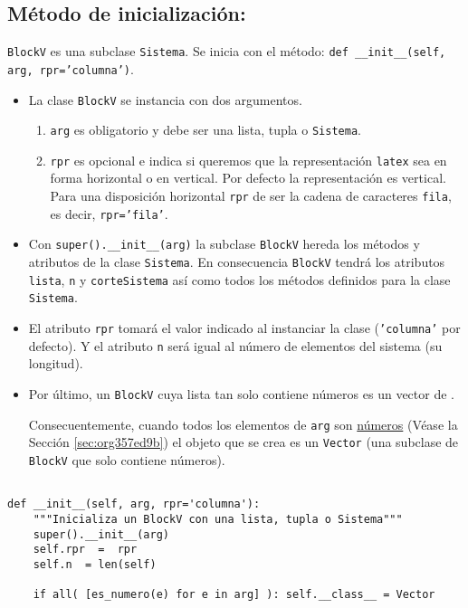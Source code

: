 \documentclass[11pt]{report}
\begin{document}
\subsection{Método de inicialización:}
\label{sec:orgc6c0e44}

\texttt{BlockV} es una subclase \texttt{Sistema}. Se inicia con el método: \texttt{def
\_\_init\_\_(self, arg, rpr='columna')}.

\begin{itemize}
\item La clase \texttt{BlockV} se instancia con dos argumentos. 

\begin{enumerate}
\item \texttt{arg} es obligatorio y debe ser una lista, tupla o \texttt{Sistema}.

\item \texttt{rpr} es opcional e indica si queremos que la representación
\texttt{latex} sea en forma horizontal o en vertical. Por defecto la
representación es vertical. Para una disposición horizontal \texttt{rpr}
de ser la cadena de caracteres \texttt{fila}, es decir, \texttt{rpr='fila'}.
\end{enumerate}

\item Con \texttt{super().\_\_init\_\_(arg)} la subclase \texttt{BlockV} hereda los métodos
y atributos de la clase \texttt{Sistema}. En consecuencia \texttt{BlockV} tendrá
los atributos \texttt{lista}, \texttt{n} y \texttt{corteSistema} así como todos los
métodos definidos para la clase \texttt{Sistema}.

\item El atributo \texttt{rpr} tomará el valor indicado al instanciar la clase
(\texttt{'columna'} por defecto). Y el atributo \texttt{n} será igual al número de
elementos del sistema (su longitud).

\item Por último, un \texttt{BlockV} cuya lista tan solo contiene números es un
vector de \R[n].

Consecuentemente, cuando todos los elementos de \texttt{arg} son \hyperref[sec:org357ed9b]{números}
(Véase la Sección \ref{sec:org357ed9b}) el objeto que se crea es un \texttt{Vector} (una
subclase de \texttt{BlockV} que solo contiene números).
\end{itemize}


\begin{verbatim}

def __init__(self, arg, rpr='columna'):
    """Inicializa un BlockV con una lista, tupla o Sistema"""
    super().__init__(arg)
    self.rpr  =  rpr
    self.n  = len(self)
    
    if all( [es_numero(e) for e in arg] ): self.__class__ = Vector

\end{verbatim}
\end{document}
